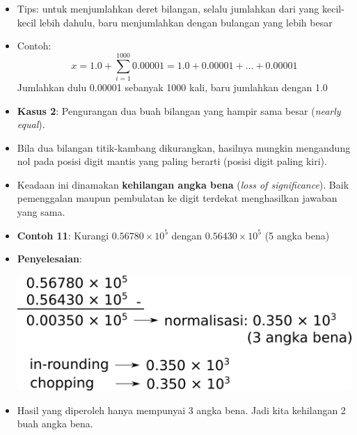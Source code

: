 \documentclass[pdflatex,compress]{beamer}
\begin{document}
\begin{frame}
	\begin{itemize}
		\item Tips: untuk menjumlahkan deret bilangan, selalu jumlahkan dari yang kecil-kecil lebih dahulu, baru menjumlahkan dengan bulangan yang lebih besar
		\item Contoh: \[ x = 1.0 + \sum_{i=1}^{1000} 0.00001 = 1.0 + 0.00001 + \dots + 0.00001 \]
		Jumlahkan dulu 0.00001 sebanyak 1000 kali, baru jumlahkan dengan 1.0
	\end{itemize}
\end{frame}

\begin{frame}
	\begin{itemize}
		\item \textbf{Kasus 2}: Pengurangan dua buah bilangan yang hampir sama besar (\textit{nearly equal}).
		\item Bila dua bilangan titik-kambang dikurangkan, hasilnya mungkin mengandung nol pada posisi digit mantis yang paling berarti (posisi digit paling kiri).
		\item Keadaan ini dinamakan \textbf{kehilangan angka bena} (\textit{loss of significance}). Baik pemenggalan maupun pembulatan ke digit terdekat menghasilkan jawaban yang sama.
	\end{itemize}
\end{frame}

\begin{frame}
	\begin{itemize}
		\item \textbf{Contoh 11}: Kurangi $ 0.56780 \times 10^5 $ dengan $ 0.56430 \times 10^5 $ (5 angka bena)
		\item[] \textbf{Penyelesaian}:
		\begin{center}
			\includegraphics[width=0.8\linewidth]{img/img105.png}
		\end{center}
		\item[] Hasil yang diperoleh hanya mempunyai 3 angka bena. Jadi kita kehilangan 2 buah angka bena.
	\end{itemize}
\end{frame}
\end{document}
